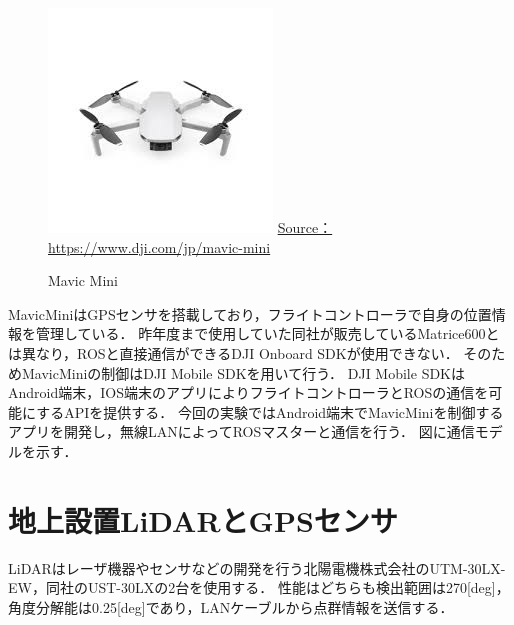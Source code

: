 \documentclass[autodetect-engine,dvipdfmx-if-dvi,ja=standard,a4j,jbase=11pt,magstyle=nomag*]{bxjsreport}
\begin{document}
\begin{figure}[b]
    \centering
    \includegraphics[width=0.9\linewidth, clip]{./figure/chapter4/mavic_mini.jpg}
    \url{Source：https://www.dji.com/jp/mavic-mini}
    \caption{Mavic Mini}
    \label{fig:mavic_mini}
\end{figure}

MavicMiniはGPSセンサを搭載しており，フライトコントローラで自身の位置情報を管理している．
昨年度まで使用していた同社が販売しているMatrice600とは異なり，ROSと直接通信ができるDJI Onboard SDKが使用できない．
そのためMavicMiniの制御はDJI Mobile SDKを用いて行う．
DJI Mobile SDKはAndroid端末，IOS端末のアプリによりフライトコントローラとROSの通信を可能にするAPIを提供する．
今回の実験ではAndroid端末でMavicMiniを制御するアプリを開発し，無線LANによってROSマスターと通信を行う．
図に通信モデルを示す．



\section{地上設置LiDARとGPSセンサ}
LiDARはレーザ機器やセンサなどの開発を行う北陽電機株式会社のUTM-30LX-EW，同社のUST-30LXの2台を使用する．
性能はどちらも検出範囲は270[deg]，角度分解能は0.25[deg]であり，LANケーブルから点群情報を送信する．
\end{document}
